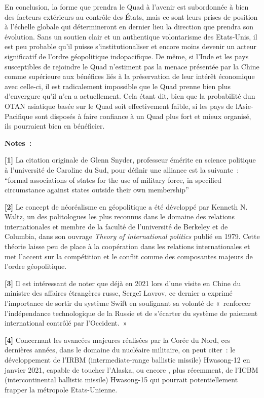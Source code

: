 \documentclass[11pt,a4paper]{article}
\begin{document}
En conclusion, la forme que prendra le Quad à l'avenir est subordonnée à bien des facteurs extérieurs au contrôle des États, mais ce sont leurs prises de position à l'échelle globale qui détermineront en dernier lieu la direction que prendra son évolution. Sans un soutien clair et un authentique volontarisme des Etats-Unis, il est peu probable qu'il puisse s'institutionaliser et encore moins devenir un acteur significatif de l'ordre géopolitique indopacifique. De même, si l'Inde et les pays susceptibles de rejoindre le Quad n'estiment pas la menace présentée par la Chine comme supérieure aux bénéfices liés à la préservation de leur intérêt économique avec celle-ci, il est radicalement impossible que le Quad prenne bien plus d'envergure qu'il n'en a actuellement. Cela étant dit, bien que la probabilité d\textquotesingle un OTAN asiatique basée sur le Quad soit effectivement faible, si les pays de l\textquotesingle Asie-Pacifique sont disposés à faire confiance à un Quad plus fort et mieux organisé, ils pourraient bien en bénéficier.

\textbf{Notes~:}

\textbf{{[}1{]}} La citation originale de Glenn Snyder, professeur émérite en science politique à l'université de Caroline du Sud, pour définir une alliance est la suivante~: ``formal associations of states for the use of military force, in specified circumstance against states outside their own membership''

\textbf{{[}2{]}} Le concept de néoréalisme en géopolitique a été développé par Kenneth N. Waltz, un des politologues les plus reconnus dans le domaine des relations internationales et membre de la faculté de l'université de Berkeley et de Columbia, dans son ouvrage \emph{Theory of international politics} publié en 1979. Cette théorie laisse peu de place à la coopération dans les relations internationales et met l'accent sur la compétition et le conflit comme des composantes majeurs de l'ordre géopolitique.

\textbf{{[}3{]}} Il est intéressant de noter que déjà en 2021 lors d'une visite en Chine du ministre des affaires étrangères russe, Sergeï Lavrov, ce dernier a exprimé l'importance de sortir du système Swift en soulignant sa volonté de «~renforcer l'indépendance technologique de la Russie et de s'écarter du système de paiement international contrôlé par l'Occident.~»

\textbf{{[}4{]}} Concernant les avancées majeures réalisées par la Corée du Nord, ces dernières années, dans le domaine du nucléaire militaire, on peut citer~: le développement de l'IRBM (intermediate-range ballistic missile) Hwasong-12 en janvier 2021, capable de toucher l'Alaska, ou encore , plus récemment, de l'ICBM (intercontinental ballistic missile) Hwasong-15 qui pourrait potentiellement frapper la métropole Etats-Unienne.
\end{document}
